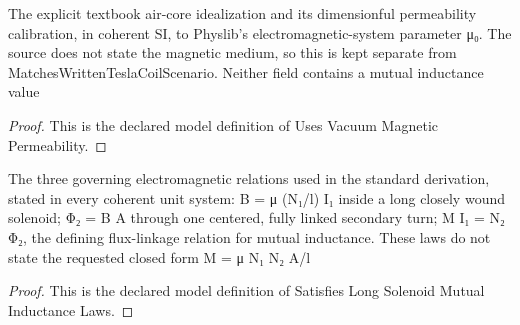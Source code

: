 \begin{definition}
  \label{def:physics:phyx-mini-0921:phyxminiproblems-problemphyxmini0921-usesvacuummagneticpermeability}
  The explicit textbook air-core idealization and its dimensionful permeability calibration, in coherent SI, to Physlib's electromagnetic-system parameter μ₀. The source does not state the magnetic medium, so this is kept separate from MatchesWrittenTeslaCoilScenario. Neither field contains a mutual inductance value
\end{definition}
\begin{proof}
  This is the declared model definition of Uses Vacuum Magnetic Permeability.
\end{proof}
\begin{definition}
  \label{def:physics:phyx-mini-0921:phyxminiproblems-problemphyxmini0921-satisfieslongsolenoidmutualinductancelaws}
  The three governing electromagnetic relations used in the standard derivation, stated in every coherent unit system: B = μ (N₁/l) I₁ inside a long closely wound solenoid; Φ₂ = B A through one centered, fully linked secondary turn; M I₁ = N₂ Φ₂, the defining flux-linkage relation for mutual inductance. These laws do not state the requested closed form M = μ N₁ N₂ A/l
\end{definition}
\begin{proof}
  This is the declared model definition of Satisfies Long Solenoid Mutual Inductance Laws.
\end{proof}
